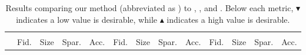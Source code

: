 
\begin{table*}[h]
\centering
\caption{Results comparing our method (abbreviated as \OurShort{}) to \baserand{}, \basekeep{}, and \baserm{}. Below each metric, $\blacktriangledown$ indicates a low value is desirable, while $\blacktriangle$ indicates a high value is desirable.}
\label{table:results1}
\setlength{\tabcolsep}{4pt}
\scriptsize{
\begin{tabular}{lrrrr rrrr rrrr}
\toprule
\multicolumn{1}{c}{} & \multicolumn{4}{c}{\synfour{}}                                                                                                                 & \multicolumn{4}{c}{\synfive{}}                                                                                                                   & \multicolumn{4}{c}{\synone{}}                                                                                                                  \\ 
\cmidrule(r){2-5}\cmidrule(r){6-9}\cmidrule{10-13} 
               & \multicolumn{1}{c}{Fid.} & \multicolumn{1}{c}{Size} & \multicolumn{1}{c}{Spar.} & \multicolumn{1}{c}{Acc.} & \multicolumn{1}{c}{Fid.} & \multicolumn{1}{c}{Size} & \multicolumn{1}{c}{Spar.} & \multicolumn{1}{c}{Acc.} & \multicolumn{1}{c}{Fid.} & \multicolumn{1}{c}{Size} & \multicolumn{1}{c}{Spar.} & \multicolumn{1}{c}{Acc.} \\



\end{tabular}}
\end{table*}
